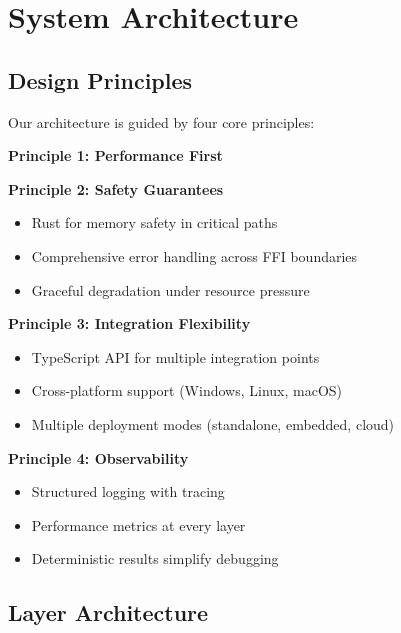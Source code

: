 \documentclass{article}
\begin{document}
\section{System Architecture}

\subsection{Design Principles}

Our architecture is guided by four core principles:

\textbf{Principle 1: Performance First}

\textbf{Principle 2: Safety Guarantees}
\begin{itemize}
    \item Rust for memory safety in critical paths
    \item Comprehensive error handling across FFI boundaries
    \item Graceful degradation under resource pressure
\end{itemize}

\textbf{Principle 3: Integration Flexibility}
\begin{itemize}
    \item TypeScript API for multiple integration points
    \item Cross-platform support (Windows, Linux, macOS)
    \item Multiple deployment modes (standalone, embedded, cloud)
\end{itemize}

\textbf{Principle 4: Observability}
\begin{itemize}
    \item Structured logging with tracing
    \item Performance metrics at every layer
    \item Deterministic results simplify debugging
\end{itemize}

\subsection{Layer Architecture}
\end{document}
